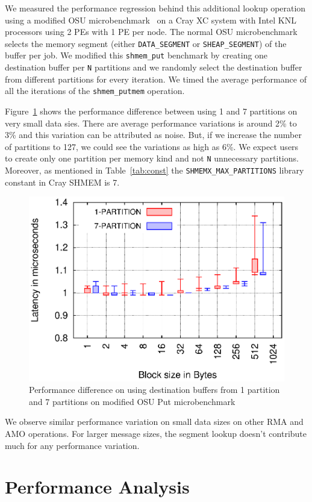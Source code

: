 We measured the performance regression behind this additional lookup
operation using a modified OSU microbenchmark~\cite{pgas-benchmarks}
on a Cray XC system with Intel KNL processors using 2 PEs with 1 PE per
node.
The normal OSU microbenchmark selects the memory segment (either
\texttt{DATA\_SEGMENT} or \texttt{SHEAP\_SEGMENT}) of the buffer
per job. We modified this \texttt{shmem\_put} benchmark by creating
one destination buffer per \texttt{N} partitions and we randomly select
the destination buffer from different partitions for every iteration.
We timed the average performance of all the iterations of the
\texttt{shmem\_putmem} operation.

Figure~\ref{graph:lookup} shows the
performance difference between using 1 and 7 partitions on very small
data sies. There are average performance variations is around 2\% to
3\% and this variation can be attributed as noise. But, if we increase
the number of partitions to 127, we could see the variations as high as
6\%. We expect users to create only one partition per memory kind
and not \texttt{N} unnecessary partitions. Moreover, as mentioned in
Table~\ref{tab:const} the \texttt{SHMEMX\_MAX\_PARTITIONS} library constant
in Cray SHMEM is 7.

\begin{figure}[t!]
    \centering
    \includegraphics[width=\linewidth]{graph/osu-put.eps}
    \caption{Performance difference on using destination buffers
    from 1 partition and 7 partitions
    on modified OSU Put microbenchmark}
    \label{graph:lookup}
    \vspace{-20pt}
\end{figure}

We observe similar performance variation on small data sizes on other
RMA and AMO operations. For larger message sizes, the segment lookup
doesn't contribute much for any performance variation.

\section{Performance Analysis}
\label{src:perf}